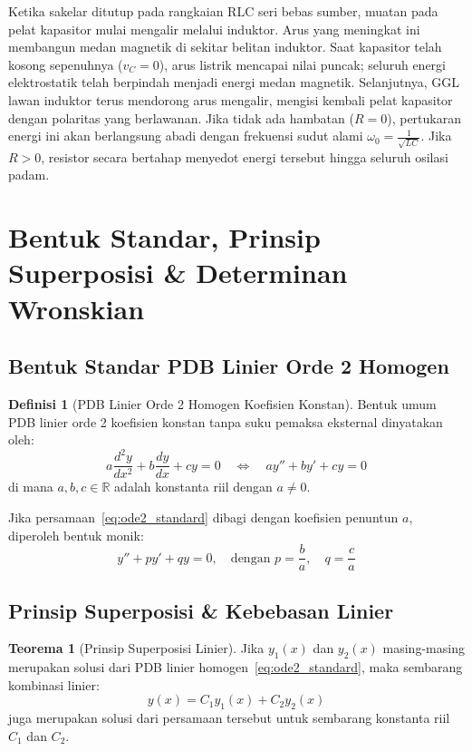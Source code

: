 \documentclass[11pt,a4paper]{article}
\theoremstyle{definition}
\newtheorem{definition}{Definisi}[section]
\newtheorem{theorem}{Teorema}[section]
\begin{document}
Ketika sakelar ditutup pada rangkaian RLC seri bebas sumber, muatan pada pelat kapasitor mulai mengalir melalui induktor. Arus yang meningkat ini membangun medan magnetik di sekitar belitan induktor. Saat kapasitor telah kosong sepenuhnya ($v_C = 0$), arus listrik mencapai nilai puncak; seluruh energi elektrostatik telah berpindah menjadi energi medan magnetik. Selanjutnya, GGL lawan induktor terus mendorong arus mengalir, mengisi kembali pelat kapasitor dengan polaritas yang berlawanan. Jika tidak ada hambatan ($R = 0$), pertukaran energi ini akan berlangsung abadi dengan frekuensi sudut alami $\omega_0 = \frac{1}{\sqrt{LC}}$. Jika $R > 0$, resistor secara bertahap menyedot energi tersebut hingga seluruh osilasi padam.

\section{Bentuk Standar, Prinsip Superposisi \& Determinan Wronskian}

\subsection{Bentuk Standar PDB Linier Orde 2 Homogen}

\begin{definition}[PDB Linier Orde 2 Homogen Koefisien Konstan]
Bentuk umum PDB linier orde 2 koefisien konstan tanpa suku pemaksa eksternal dinyatakan oleh:
\begin{equation}
    a \frac{d^2y}{dx^2} + b \frac{dy}{dx} + c y = 0 \quad \iff \quad a y'' + b y' + c y = 0
    \label{eq:ode2_standard}
\end{equation}
di mana $a, b, c \in \mathbb{R}$ adalah konstanta riil dengan $a \neq 0$.
\end{definition}

Jika persamaan~\eqref{eq:ode2_standard} dibagi dengan koefisien penuntun $a$, diperoleh bentuk monik:
\begin{equation}
    y'' + p y' + q y = 0, \quad \text{dengan } p = \frac{b}{a}, \quad q = \frac{c}{a}
    \label{eq:ode2_monic}
\end{equation}

\subsection{Prinsip Superposisi \& Kebebasan Linier}

\begin{theorem}[Prinsip Superposisi Linier]
Jika $y_1(x)$ dan $y_2(x)$ masing-masing merupakan solusi dari PDB linier homogen~\eqref{eq:ode2_standard}, maka sembarang kombinasi linier:
\begin{equation}
    y(x) = C_1 y_1(x) + C_2 y_2(x)
    \label{eq:superposition}
\end{equation}
juga merupakan solusi dari persamaan tersebut untuk sembarang konstanta riil $C_1$ dan $C_2$.
\end{theorem}
\end{document}
